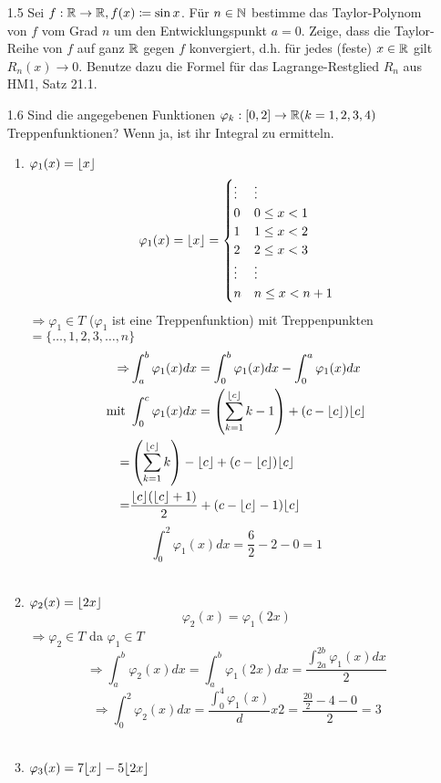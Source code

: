 \documentclass{HM}
\begin{document}
	\begin{enumerate}
		\item[1.5] Sei $f:\mathbb{R}\to\mathbb{R}, f(x)\coloneqq\sin x$. Für $n\in\mathbb{N}$ bestimme das Taylor-Polynom von $f$ vom Grad $n$ um den Entwicklungspunkt $a=0$. Zeige, dass die Taylor-Reihe von $f$ auf ganz $\mathbb{R}$ gegen $f$ konvergiert, d.h. für jedes (feste) $x\in\mathbb{R}$ gilt $R_n(x)\to 0$. Benutze dazu die Formel für das Lagrange-Restglied $R_n$ aus HM1, Satz 21.1.
		
		\item[1.6] Sind die angegebenen Funktionen $\varphi_k:[0,2]\to\mathbb{R}(k=1,2,3,4)$ Treppenfunktionen? Wenn ja, ist ihr Integral zu ermitteln.
		\begin{enumerate}
			\item $\varphi_1(x)=\lfloor x\rfloor$
				$$\varphi_1(x)=\lfloor x\rfloor=\begin{cases}
					\vdots& \vdots\\
					0&0\leq x < 1\\
					1&1\leq x < 2\\
					2&2\leq x < 3\\
					\vdots& \vdots\\
					n&n\leq x < n+1				
				\end{cases}$$
				$\Rightarrow \varphi_1\in T$ ($\varphi_1$ ist eine Treppenfunktion) mit Treppenpunkten $= \{\hdots,1,2,3,\hdots,n\}$\\
				\begin{align*}
					\Rightarrow &\int_a^b\varphi_1(x)dx = \int_0^b\varphi_1(x)dx-\int_0^a\varphi_1(x)dx\\
					\text{mit }&\int_0^c\varphi_1(x)dx
					=\left(\sum\limits_{k=1}^{\lfloor c\rfloor}k-1\right) + (c-\lfloor c\rfloor)\lfloor c\rfloor\\
					=&\left(\sum\limits_{k=1}^{\lfloor c\rfloor}k\right) - \lfloor c\rfloor + (c-\lfloor c\rfloor)\lfloor c\rfloor\\
					=&\frac{\lfloor c\rfloor(\lfloor c\rfloor+1)}{2}+(c-\lfloor c\rfloor-1)\lfloor c\rfloor
				\end{align*}
				$$\int_0^2\varphi_1(x)dx=\frac{6}{2}-2-0=1$$\\
			\item $\varphi_2(x)=\lfloor2x\rfloor$
				$$\varphi_2(x)=\varphi_1(2x)$$
				$\Rightarrow \varphi_2\in T$ da $\varphi_1\in T$
				$$\Rightarrow \int_a^b\varphi_2(x)dx=\int_a^b\varphi_1(2x)dx=\frac{\int_{2a}^{2b}\varphi_1(x)dx}{2}$$
				$$\Rightarrow\int_0^2\varphi_2(x)dx=\frac{\int_0^4\varphi_1(x)}dx{2}=\frac{\frac{20}{2}-4-0}{2}=3$$\\
			\item $\varphi_3(x)=7\lfloor x\rfloor-5\lfloor2x\rfloor$

\end{enumerate}
\end{enumerate}
\end{document}
